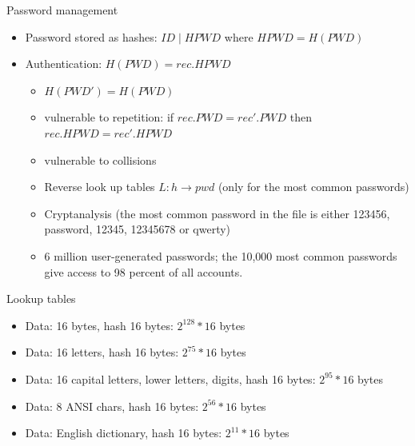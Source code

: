 \documentclass{beamer}
\begin{document}
\begin{frame}{Password management}
  \begin{itemize}
    \item Password stored as hashes: $ID \mid HPWD$ where $HPWD=H(PWD)$ 
    \item Authentication: $H(PWD) = rec.HPWD$
      \begin{itemize}
        \item<2-> $H(PWD')=H(PWD)$
        \item<3-> vulnerable to repetition: if $rec.PWD = rec'.PWD$ then $rec.HPWD = rec'.HPWD$
        \item<4-> vulnerable to collisions
        \item<5-> Reverse look up tables $L: h \rightarrow pwd$ (only for the most common passwords)
        \item<6-> Cryptanalysis (the most common password in the file is either 123456, password, 12345, 12345678 or qwerty)
        \item<7-> 6 million user-generated passwords; the 10,000 most common passwords give access to 98 percent of all accounts. 
      \end{itemize}
  \end{itemize}
\end{frame}


\begin{frame}{Lookup tables}
  \begin{itemize}
    \item Data: 16 bytes, hash 16 bytes: $2^{128}*16$ bytes 
    \item Data: 16 letters, hash 16 bytes: $2^{75}*16$ bytes
    \item Data: 16 capital letters, lower letters, digits, hash 16 bytes: $2^{95}*16$ bytes
    \item Data: 8 ANSI chars, hash 16 bytes: $2^{56}*16$ bytes
    \item Data: English dictionary, hash 16 bytes: $2^{11}*16$ bytes
  \end{itemize}
\end{frame}
\end{document}

